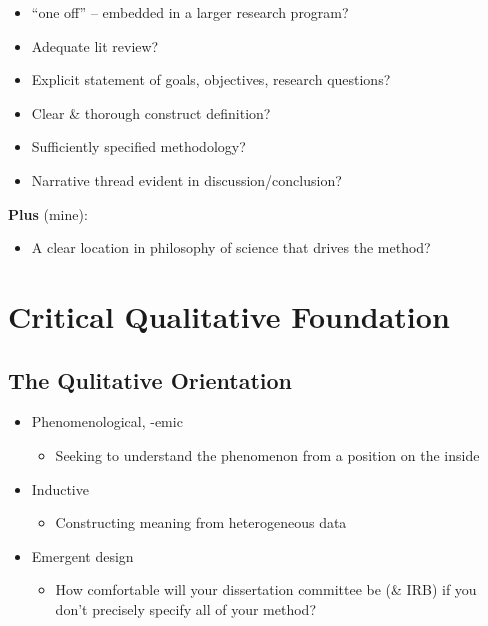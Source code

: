 \documentclass[
  english,
]{book}
\providecommand{\tightlist}{%
  \setlength{\itemsep}{0pt}\setlength{\parskip}{0pt}}
\begin{document}
\begin{itemize}
\tightlist
\item
  ``one off'' -- embedded in a larger research program?
\item
  Adequate lit review?
\item
  Explicit statement of goals, objectives, research questions?
\item
  Clear \& thorough construct definition?
\item
  Sufficiently specified methodology?
\item
  Narrative thread evident in discussion/conclusion?
\end{itemize}

\textbf{Plus} (mine):

\begin{itemize}
\tightlist
\item
  A clear location in philosophy of science that drives the method?
\end{itemize}

\hypertarget{critical-qualitative-foundation}{%
\section{Critical Qualitative Foundation}\label{critical-qualitative-foundation}}

\hypertarget{the-qulitative-orientation}{%
\subsection{The Qulitative Orientation}\label{the-qulitative-orientation}}

\begin{itemize}
\tightlist
\item
  Phenomenological, -emic

  \begin{itemize}
  \tightlist
  \item
    Seeking to understand the phenomenon from a position on the inside
  \end{itemize}
\item
  Inductive

  \begin{itemize}
  \tightlist
  \item
    Constructing meaning from heterogeneous data
  \end{itemize}
\item
  Emergent design

  \begin{itemize}
  \tightlist
  \item
    How comfortable will your dissertation committee be (\& IRB) if you don't precisely specify all of your method?
  \end{itemize}
\end{itemize}
\end{document}
